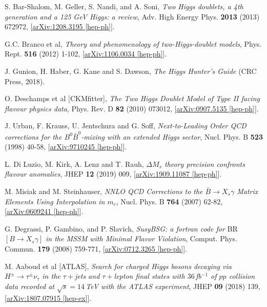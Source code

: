 \documentclass[a4paper,12pt]{article}
\begin{document}
\begin{thebibliography}{99}
S. Bar-Shalom, M. Geller, S. Nandi, and A. Soni, \emph{Two Higgs doublets, a 4th generation and a 125 GeV Higgs: a review}, Adv. High Energy Phys. \textbf{2013} (2013) 672972, [\href{https://arxiv.org/abs/1208.3195v2}{arXiv:1208.3195 [hep-ph]}].%

G.C. Branco et al, \emph{Theory and phenomenology of two-Higgs-doublet models}, Phys. Rept. \textbf{516} (2012) 1-102, [\href{https://arxiv.org/pdf/1106.0034.pdf}{arXiv:1106.0034 [hep-ph]}].%

J. Gunion, H. Haber, G. Kane and S. Dawson, \emph{The Higgs Hunter's Guide} (CRC Press, 2018).

O. Deschamps et al [CKMfitter], \emph{The Two Higgs Doublet Model of Type II facing flavour physics data}, Phys. Rev. D \textbf{82} (2010) 073012, [\href{https://arxiv.org/abs/0907.5135}{arXiv:0907.5135 [hep-ph]}].%

J. Urban, F. Krauss, U. Jentschura and G. Soff, \emph{Next-to-Leading Order QCD corrections for the $B^0\bar{B}^0$-mixing with an extended Higgs sector}, Nucl. Phys. B \textbf{523} (1998) 40-58, [\href{https://arxiv.org/abs/hep-ph/9710245}{arXiv:9710245 [hep-ph]}].%

L. Di Luzio, M. Kirk, A. Lenz and T. Rauh, \emph{$\Delta M_s$ theory precision confronts flavour anomalies}, JHEP \textbf{12} (2019) 009, [\href{https://arxiv.org/abs/1909.11087}{arXiv:1909.11087 [hep-ph]}].%

M. Misiak and M. Steinhauser, \emph{NNLO QCD Corrections to the $\bar{B}\to X_s\gamma$ Matrix Elements Using Interpolation in $m_c$}, Nucl. Phys. B \textbf{764} (2007) 62-82, [\href{https://arxiv.org/abs/hep-ph/0609241}{arXiv:0609241 [hep-ph]}].%

G. Degrassi, P. Gambino, and P. Slavich, \emph{SusyBSG: a fortran code for} BR$[B\to X_s\gamma]$ \emph{in the MSSM with Minimal Flavor Violation}, Comput. Phys. Commun. \textbf{179} (2008) 759-771, [\href{https://arxiv.org/abs/0712.3265}{arXiv:0712.3265 [hep-ph]}].%

M. Aaboud et al [ATLAS], \emph{Search for charged Higgs bosons decaying via $H^{\pm}\to\tau^\pm\nu_\tau$ in the $\tau+$jets and $\tau+$lepton final states with $36\,$fb$^{-1}$ of $pp$ collision data recorded at $\sqrt{s}=14\,$TeV with the ATLAS experiment}, JHEP \textbf{09} (2018) 139, [\href{https://arxiv.org/abs/1807.07915}{arXiv:1807.07915 [hep-ex]}].%


\end{thebibliography}
\end{document}
